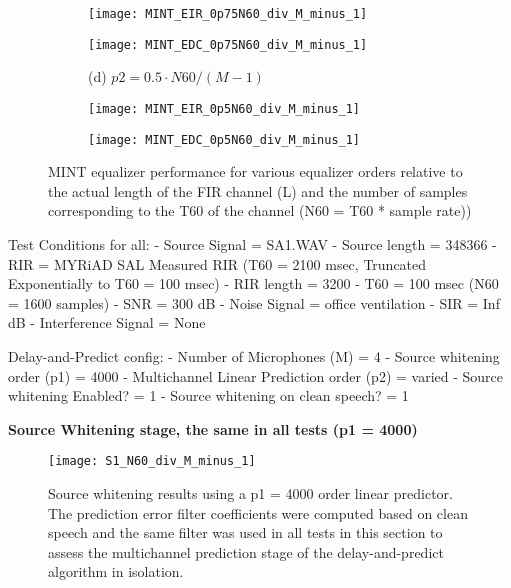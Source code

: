 \begin{figure}[H]
\begin{subfigure}[c]{0.2\textwidth}
\begin{minipage}[c][0.3\textwidth][c]{\linewidth}
		\end{minipage}
	\end{subfigure}
	\begin{subfigure}[b]{0.3\textwidth}
		\centering
		\texttt{[image: MINT\_EIR\_0p75N60\_div\_M\_minus\_1]}
	\end{subfigure}
	\begin{subfigure}[b]{0.3\textwidth}
		\centering
		\texttt{[image: MINT\_EDC\_0p75N60\_div\_M\_minus\_1]}
	\end{subfigure}
	\begin{subfigure}[c]{0.2\textwidth}
		\centering
		\begin{minipage}[c][0.3\textwidth][c]{\linewidth} %
			\centering
			(d) \newline $p2 = 0.5 \cdot N60 / (M-1)$
		\end{minipage}
	\end{subfigure}
   \begin{subfigure}[b]{0.3\textwidth}
		\centering
		\texttt{[image: MINT\_EIR\_0p5N60\_div\_M\_minus\_1]}
	\end{subfigure}
	\begin{subfigure}[b]{0.3\textwidth}
		\centering
		\texttt{[image: MINT\_EDC\_0p5N60\_div\_M\_minus\_1]}
	\end{subfigure}
	\caption{MINT equalizer performance for various equalizer orders relative to the actual length of the FIR channel (L) and the number of samples corresponding to the T60 of the channel (N60 = T60 * sample rate))}
	\label{fig:params_p2_MINT_compare}
\end{figure}

Test Conditions for all:
- Source Signal = SA1.WAV
- Source length = 348366
- RIR = MYRiAD SAL Measured RIR (T60 = 2100 msec, Truncated Exponentially to T60 = 100 msec)
- RIR length = 3200
- T60 = 100 msec (N60 = 1600 samples)
- SNR = 300 dB
- Noise Signal = office ventilation
- SIR = Inf dB
- Interference Signal = None

Delay-and-Predict config:
- Number of Microphones (M) = 4
- Source whitening order (p1) = 4000
- Multichannel Linear Prediction order (p2) = varied
- Source whitening Enabled? = 1
- Source whitening on clean speech? = 1

\textbf{Source Whitening stage, the same in all tests (p1 = 4000)}

\begin{figure}[H]
	\texttt{[image: S1\_N60\_div\_M\_minus\_1]}
	\centering
	\caption{Source whitening results using a p1 = 4000 order linear predictor. The prediction error filter coefficients were computed based on clean speech and the same filter was used in all tests in this section to assess the multichannel prediction stage of the delay-and-predict algorithm in isolation.}
	\label{fig:params_p2_stage1}
\end{figure}

